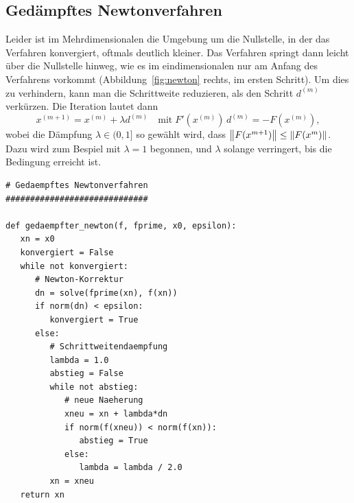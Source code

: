 \subsection{Gedämpftes Newtonverfahren}

Leider ist im Mehrdimensionalen die Umgebung um die Nullstelle, in der
das Verfahren konvergiert, oftmals deutlich kleiner. Das Verfahren
springt dann leicht über die Nullstelle hinweg, wie es im
eindimensionalen nur am Anfang des Verfahrens vorkommt
(\zb Abbildung~\ref{fig:newton} rechts, im ersten Schritt). Um dies
zu verhindern, kann man die Schrittweite reduzieren, als den Schritt
$d^{(m)}$ verkürzen. Die Iteration lautet dann
\begin{equation}
  x^{(m+1)} = x^{(m)} + \lambda d^{(m)}\quad\text{mit}\;
  F'(x^{(m)})\,d^{(m)} = -F(x^{(m)}),
\end{equation}
wobei die Dämpfung $\lambda\in (0,1]$ so gewählt wird, dass
$\left\lVert{F(x^{m+1})}\right\rVert\le\left\lVert{F(x^{m})}\right\rVert$. Dazu wird zum Bespiel mit
$\lambda=1$ begonnen, und $\lambda$ solange verringert, bis die
Bedingung erreicht ist.

\begin{lstlisting}[style=floating,deletekeywords={lambda},
caption={Gedämpftes Newtonverfahren in mehreren
Dimensionen. \lstinline!f(x)! muß
eine vektorwertige Funktion sein, \lstinline!fprime(x)! ihre
Ableitung, d.h. eine matrixwertige Funktion.}]
# Gedaempftes Newtonverfahren
#############################

def gedaempfter_newton(f, fprime, x0, epsilon):
   xn = x0
   konvergiert = False
   while not konvergiert:
      # Newton-Korrektur
      dn = solve(fprime(xn), f(xn))
      if norm(dn) < epsilon:
         konvergiert = True
      else:
         # Schrittweitendaempfung
         lambda = 1.0
         abstieg = False
         while not abstieg:
            # neue Naeherung
            xneu = xn + lambda*dn
            if norm(f(xneu)) < norm(f(xn)):
               abstieg = True
            else:
               lambda = lambda / 2.0
         xn = xneu
   return xn
\end{lstlisting}

